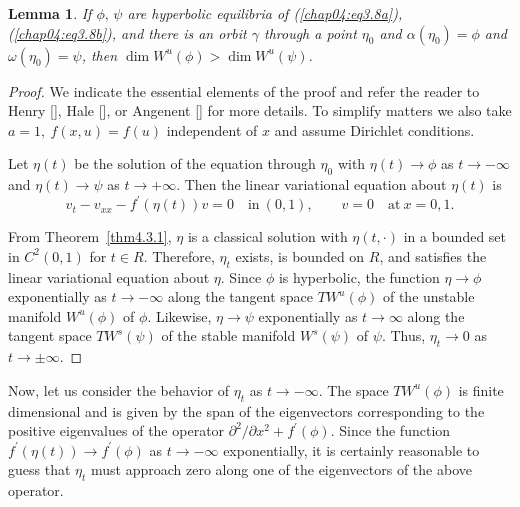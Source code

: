 \documentclass{surv-l}
\theoremstyle{plain}
\newtheorem{lemma}[theorem]{Lemma}
\theoremstyle{definition}
\numberwithin{equation}{section}
\numberwithin{figure}{chapter}
\begin{document}
\begin{lemma}\label{lem4.3.2}
If $\phi,\,\psi$ are hyperbolic equilibria of \emph{(\ref{chap04:eq3.8a})}, \emph{(\ref{chap04:eq3.8b})}, and there is
an orbit $\gamma$ through a point $\eta_{0}$ and $\alpha(\eta_{0})=\phi$ and $\omega(\eta_{0})=\psi$, then $\dim W^{u}(\phi)> \dim W^{u}(\psi)$.
\end{lemma}

\begin{proof}
We indicate the essential elements of the proof and refer the reader to Henry [\citeyear{1985henry}], Hale [\citeyear{1985h}], or Angenent [\citeyear{1986a}] for more details. To simplify matters we also take $a=1,\ f(x, u)=f(u)$ independent of $x$ and assume Dirichlet conditions.

Let $\eta(t)$ be the solution of the equation through $\eta_{0}$ with $\eta(t)\rightarrow\phi$ as $ t\rightarrow-\infty$ and $\eta(t)\rightarrow\psi$ as $ t\rightarrow+\infty$. Then the linear variational equation about $\eta(t)$ is
\begin{equation*}
v_{t}-v_{xx}-f^{\prime}(\eta(t))v=0\quad \mathrm{in}\ (0,1),\qquad v=0\quad \mathrm{at}\ x=0,1.
\end{equation*}

From Theorem~\ref{thm4.3.1}, $\eta$ is a classical solution with $\eta(t, \cdot)$ in a bounded set in $C^{2}(0,1)$ for $t\in R$. Therefore, $\eta_{t}$ exists, is bounded on $R$, and satisfies the linear variational equation about $\eta$. Since $\phi$ is hyperbolic, the function $\eta\rightarrow\phi$ exponentially as $ t\rightarrow-\infty$ along the tangent space $TW^{u}(\phi)$ of the unstable manifold $W^{u}(\phi)$ of $\phi$. Likewise, $\eta\rightarrow\psi$ exponentially as $ t\rightarrow\infty$ along the tangent space $TW^{s}(\psi)$ of the stable manifold $W^{s}(\psi)$ of $\psi$. Thus, $\eta_{t}\rightarrow 0$ as $ t\rightarrow\pm\infty$.
\end{proof}

Now, let us consider the behavior of $\eta_{t}$ as $ t\rightarrow-\infty$. The space $TW^{u}(\phi)$ is finite dimensional and is given by the span of the eigenvectors corresponding to the positive eigenvalues of the operator $\partial^{2}/\partial x^{2}+f^{\prime}(\phi)$. Since the function $f^{\prime}(\eta(t))\rightarrow f^{\prime}(\phi)$ as $ t\rightarrow-\infty$ exponentially, it is certainly reasonable to guess that $\eta_{t}$ must approach zero along one of the eigenvectors of the above operator.
\end{document}
